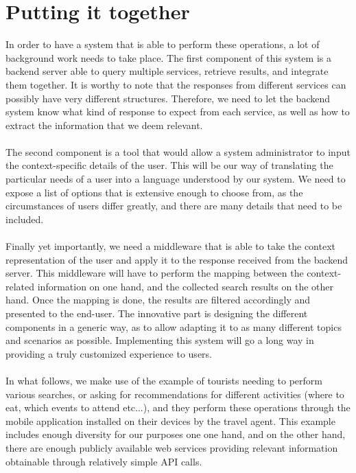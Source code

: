 \section{Putting it together}
\label{sec:together}
In order to have a system that is able to perform these operations, a lot of background work needs to take place. The first component of this system is a backend server able to query multiple services, retrieve results, and integrate them together. It is worthy to note that the responses from different services can possibly have very different structures. Therefore, we need to let the backend system know what kind of response to expect from each service, as well as how to extract the information that we deem relevant.\\\\
The second component is a tool that would allow a system administrator to input the context-specific details of the user. This will be our way of translating the particular needs of a user into a language understood by our system. We need to expose a list of options that is extensive enough to choose from, as the circumstances of users differ greatly, and there are many details that need to be included.\\\\
Finally yet importantly, we need a middleware that is able to take the context representation of the user and apply it to the response received from the backend server. This middleware will have to perform the mapping between the context-related information on one hand, and the collected search results on the other hand. Once the mapping is done, the results are filtered accordingly and presented to the end-user. The innovative part is designing the different components in a generic way, as to allow adapting it to as many different topics and scenarios as possible. Implementing this system will go a long way in providing a truly customized experience to users.\\\\
In what follows, we make use of the example of tourists needing to perform various searches, or asking for recommendations for different activities (where to eat, which events to attend etc...), and they perform these operations through the mobile application installed on their devices by the travel agent. This example includes enough diversity for our purposes one one hand, and on the other hand, there are enough publicly available web services providing relevant information obtainable through relatively simple API calls.

